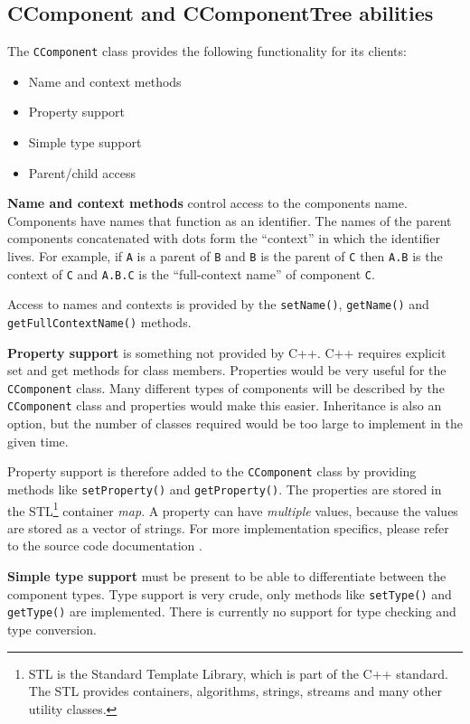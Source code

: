\subsection{CComponent and CComponentTree abilities}
\label{sect:design:component_abilities}
The \verb=CComponent= class provides the following functionality for its
clients:
\begin{itemize}
\item Name and context methods
\item Property support
\item Simple type support
\item Parent/child access
\end{itemize}

\bigskip \noindent
\textbf{Name and context methods} control access to the components name.
Components have names that function as an identifier. The names of the parent
components concatenated with dots form the ``context'' in which the identifier
lives. For example, if \verb=A= is a parent of \verb=B= and \verb=B= is the
parent of
\verb=C= then \verb=A.B= is the context of \verb=C= and \verb=A.B.C= is the
``full-context name'' of component \verb=C=.

Access to names and contexts is provided by the \verb=setName()=,
\verb=getName()= and \verb=getFullContextName()= methods.

\bigskip \noindent
\textbf{Property support} is something not provided by C++. C++ requires
explicit set and get methods for class members. Properties would be very useful
for the
\verb=CComponent= class. Many different types of components will be described
by the \verb=CComponent= class and properties would make this easier.
Inheritance is also an option, but the number of classes required would be too
large to implement in the given time.

Property support is therefore added to the \verb=CComponent= class by providing
methods like \verb=setProperty()= and \verb=getProperty()=. The properties are
stored in the STL\footnote{STL is the Standard Template Library, which is part
of the C++ standard. The STL provides containers, algorithms, strings, streams
and many other utility classes.} container \emph{map}. A property can have
\emph{multiple} values, because the values are stored as a vector of strings.
For more implementation specifics, please refer to the source code
documentation \cite{SPOCK}.

\bigskip \noindent
\textbf{Simple type support} must be present to be able to differentiate
between the component types. Type support is very crude, only methods like
\verb=setType()= and \verb=getType()= are implemented. There is currently no
support for type checking and type conversion.

